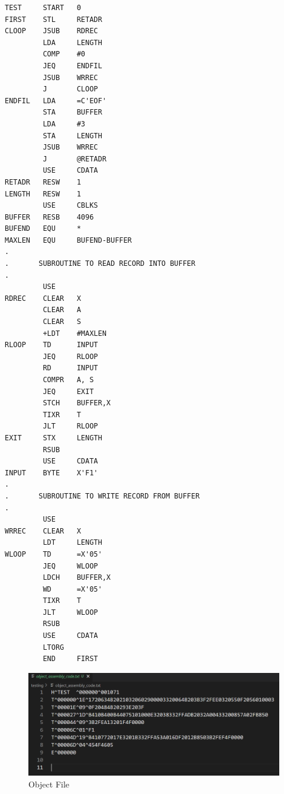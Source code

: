 \documentclass[
]{article}
\begin{document}
\begin{verbatim}
TEST     START   0            
FIRST    STL     RETADR            
CLOOP    JSUB    RDREC             
         LDA     LENGTH            
         COMP    #0                
         JEQ     ENDFIL            
         JSUB    WRREC             
         J       CLOOP             
ENDFIL   LDA     =C'EOF'               
         STA     BUFFER
         LDA     #3            
         STA     LENGTH
         JSUB    WRREC            
         J       @RETADR           
         USE     CDATA                      
RETADR   RESW    1
LENGTH   RESW    1
         USE     CBLKS
BUFFER   RESB    4096              
BUFEND   EQU     *
MAXLEN   EQU     BUFEND-BUFFER
.
.       SUBROUTINE TO READ RECORD INTO BUFFER
.
         USE
RDREC    CLEAR   X              
         CLEAR   A              
         CLEAR   S
         +LDT    #MAXLEN
RLOOP    TD      INPUT             
         JEQ     RLOOP             
         RD      INPUT            
         COMPR   A, S              
         JEQ     EXIT              
         STCH    BUFFER,X          
         TIXR    T            
         JLT     RLOOP            
EXIT     STX     LENGTH            
         RSUB
         USE     CDATA              
INPUT    BYTE    X'F1'             
.
.       SUBROUTINE TO WRITE RECORD FROM BUFFER
.
         USE
WRREC    CLEAR   X            
         LDT     LENGTH
WLOOP    TD      =X'05'        
         JEQ     WLOOP           
         LDCH    BUFFER,X        
         WD      =X'05'          
         TIXR    T            
         JLT     WLOOP             
         RSUB
         USE     CDATA   
         LTORG                  
         END     FIRST
\end{verbatim}

\begin{figure}[H]
\centering
\includegraphics{img/image-5.png}
\caption{Object File}
\end{figure}
\end{document}
